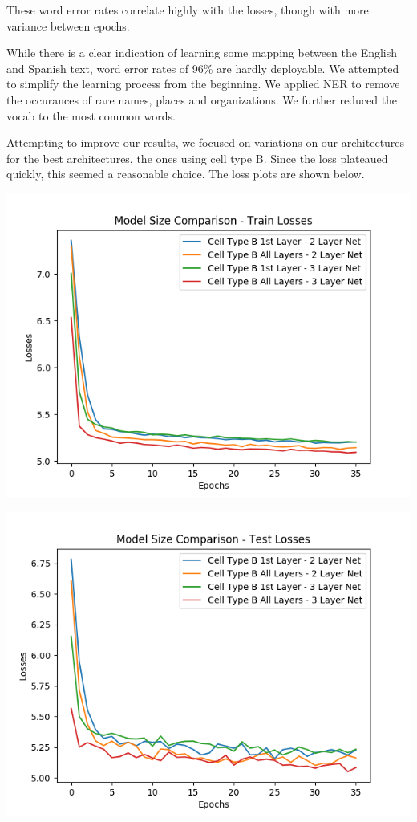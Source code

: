 \documentclass[letterpaper, 10pt]{article}
\begin{document}
\begin{multicols}{2}
These word error rates correlate highly with the losses, though with more variance between epochs.

While there is a clear indication of learning some mapping between the English and Spanish text,
word error rates of 96\% are hardly deployable.
We attempted to simplify the learning process from the beginning.
We applied NER to remove the occurances of rare names, places and organizations.
We further reduced the vocab to the most common words.

Attempting to improve our results, we focused on variations on our architectures for the best
architectures, the ones using cell type B.
Since the loss plateaued quickly, this seemed a reasonable choice.
The loss plots are shown below.

\begin{center}
\includegraphics[scale=.4]{size_comparison_losses_train}
\end{center}

\begin{center}
\includegraphics[scale=.4]{size_comparison_losses_test}
\end{center}


\end{multicols}
\end{document}
